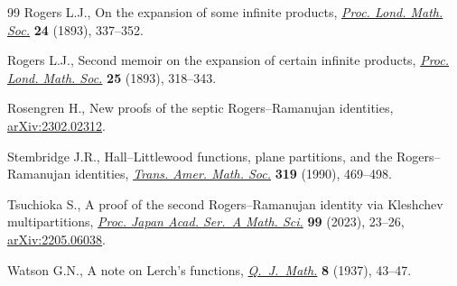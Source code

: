 \documentclass[11pt]{article}
\numberwithin{equation}{section}
\numberwithin{equation}{section}
\begin{document}
\begin{thebibliography}{99}
Rogers L.J., On the expansion of some infinite products, \href{https://doi.org/10.1112/plms/s1-24.1.337}{\textit{Proc. Lond.
 Math. Soc.}} \textbf{24} (1893), 337--352.

Rogers L.J., Second memoir on the expansion of certain infinite products,
 \href{https://doi.org/10.1112/plms/s1-25.1.318}{\textit{Proc. Lond. Math. Soc.}} \textbf{25} (1893), 318--343.

Rosengren H., New proofs of the septic {R}ogers--{R}amanujan identities,
 \href{https://arxiv.org/abs/2302.02312}{arXiv:2302.02312}.

Stembridge J.R., {H}all--{L}ittlewood functions, plane partitions, and the
 {R}ogers--{R}amanujan identities, \href{https://doi.org/10.2307/2001250}{\textit{Trans. Amer. Math. Soc.}}
 \textbf{319} (1990), 469--498.

Tsuchioka S., A proof of the second {R}ogers--{R}amanujan identity via
 {K}leshchev multipartitions, \href{https://doi.org/10.3792/pjaa.99.005}{\textit{Proc. Japan Acad. Ser.~A Math. Sci.}}
 \textbf{99} (2023), 23--26, \href{https://arxiv.org/abs/2205.06038}{arXiv:2205.06038}.

Watson G.N., A note on Lerch's functions, \href{https://doi.org/10.1093/qmath/os-8.1.43}{\textit{Q.~J.~Math.}} \textbf{8}
 (1937), 43--47.

\end{thebibliography}
\end{document}

